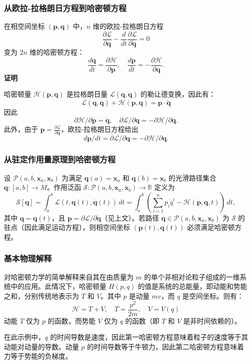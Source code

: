 \subsubsection{从欧拉-拉格朗日方程到哈密顿方程 } 
在相空间坐标 \( (\boldsymbol{p}, \boldsymbol{q}) \) 中，\( n \) 维的欧拉-拉格朗日方程
\[
\frac{\partial \mathcal{L}}{\partial \boldsymbol{q}} - \frac{d}{dt} \frac{\partial \mathcal{L}}{\partial \boldsymbol{\dot{q}}} = 0~
\]
变为 \( 2n \) 维的哈密顿方程：
\[
\frac{d \boldsymbol{q}}{dt} = \frac{\partial \mathcal{H}}{\partial \boldsymbol{p}}, \quad \frac{d \boldsymbol{p}}{dt} = -\frac{\partial \mathcal{H}}{\partial \boldsymbol{q}}.~
\]
\textbf{证明}  

哈密顿量 \( \mathcal{H}(\boldsymbol{p}, \boldsymbol{q}) \) 是拉格朗日量 \( \mathcal{L}(\boldsymbol{q}, \boldsymbol{\dot{q}}) \) 的勒让德变换，因此有：
\[
\mathcal{L}(\boldsymbol{q}, \boldsymbol{\dot{q}}) + \mathcal{H}(\boldsymbol{p}, \boldsymbol{q}) = \boldsymbol{p} \cdot \boldsymbol{\dot{q}}~
\]
因此
\[
\partial \mathcal{H}/\partial \boldsymbol{p} = \boldsymbol{\dot{q}}, \quad \partial \mathcal{L}/\partial \boldsymbol{q} = -\partial \mathcal{H}/\partial \boldsymbol{q}.~
\]
此外，由于 \( \boldsymbol{p} = \frac{\partial \mathcal{L}}{\partial \boldsymbol{\dot{q}}} \)，欧拉-拉格朗日方程给出
\[
d \boldsymbol{p}/dt = \partial \mathcal{L}/\partial \boldsymbol{q} = -\partial \mathcal{H}/\partial \boldsymbol{q}.~
\]
\subsubsection{从驻定作用量原理到哈密顿方程 } 
设 \( \mathcal{P}(a, b, \boldsymbol{x}_a, \boldsymbol{x}_b) \) 为满足 \( \boldsymbol{q}(a) = \boldsymbol{x}_a \) 和 \( \boldsymbol{q}(b) = \boldsymbol{x}_b \) 的光滑路径集合 \( \boldsymbol{q}: [a, b] \to M \)。作用泛函 \( \mathcal{S}: \mathcal{P}(a, b, \boldsymbol{x}_a, \boldsymbol{x}_b) \to \mathbb{R} \) 定义为
\[
\mathcal{S}[\boldsymbol{q}] = \int_a^b \mathcal{L}(t, \boldsymbol{q}(t), \dot{\boldsymbol{q}}(t)) \, dt = \int_a^b \left(\sum_{i=1}^n p_i \dot{q}^i - \mathcal{H}(\boldsymbol{p}, \boldsymbol{q}, t)\right) \, dt,~
\]
其中 \( \boldsymbol{q} = \boldsymbol{q}(t) \)，且 \( \boldsymbol{p} = \partial \mathcal{L} / \partial \boldsymbol{\dot{q}} \)（见上文）。若路径 \( \boldsymbol{q} \in \mathcal{P}(a, b, \boldsymbol{x}_a, \boldsymbol{x}_b) \) 为 \( \mathcal{S} \) 的驻点（因此满足运动方程），则相空间坐标 \( (\boldsymbol{p}(t), \boldsymbol{q}(t)) \) 必须满足哈密顿方程。
\subsubsection{基本物理解释}  
对哈密顿力学的简单解释来自其在由质量为 \( m \) 的单个非相对论粒子组成的一维系统中的应用。此情况下，哈密顿量 \( H(p, q) \) 的值是系统的总能量，即动能和势能之和，分别传统地表示为 \( T \) 和 \( V \)。其中 \( p \) 是动量 \( mv \)，而 \( q \) 是空间坐标。则有：
\[
\mathcal{H} = T + V, \quad T = \frac{p^2}{2m}, \quad V = V(q)~
\]
动能 \( T \) 仅为 \( p \) 的函数，而势能 \( V \) 仅为 \( q \) 的函数（即 \( T \) 和 \( V \) 是非时间依赖的）。

在此示例中，\( q \) 的时间导数是速度，因此第一哈密顿方程意味着粒子的速度等于其动能对动量的导数。动量 \( p \) 的时间导数等于牛顿力，因此第二哈密顿方程意味着力等于势能的负梯度。